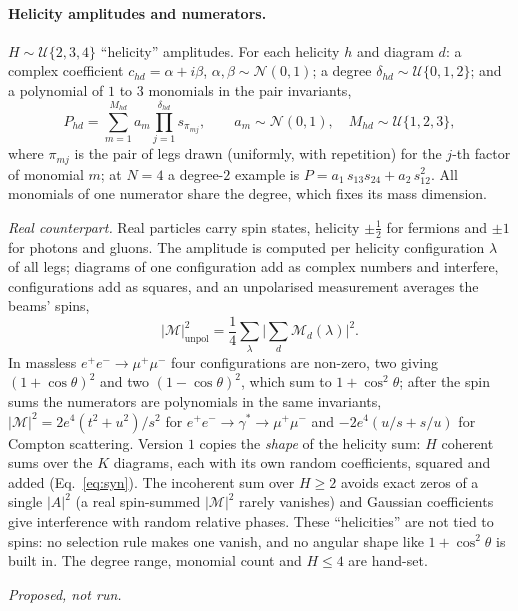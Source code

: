 \documentclass[11pt]{article}
\begin{document}
\paragraph{Helicity amplitudes and numerators.} $H\sim\mathcal U\{2,3,4\}$ ``helicity'' amplitudes. For each helicity
$h$ and diagram $d$: a complex coefficient $c_{hd}=\alpha+i\beta$, $\alpha,\beta\sim\mathcal N(0,1)$; a degree
$\delta_{hd}\sim\mathcal U\{0,1,2\}$; and a polynomial of $1$ to $3$ monomials in the pair invariants,
\begin{equation}
  P_{hd}=\sum_{m=1}^{M_{hd}}a_m\prod_{j=1}^{\delta_{hd}}s_{\pi_{mj}},\qquad a_m\sim\mathcal N(0,1),\quad
  M_{hd}\sim\mathcal U\{1,2,3\},
\end{equation}
where $\pi_{mj}$ is the pair of legs drawn (uniformly, with repetition) for the $j$-th factor of monomial $m$; at $N=4$ a
degree-$2$ example is $P=a_1\,s_{13}s_{24}+a_2\,s_{12}^2$. All monomials of one numerator share the degree, which fixes
its mass dimension.
\par\smallskip\noindent \emph{Real counterpart.} Real particles carry spin states, helicity $\pm\tfrac12$ for fermions and $\pm1$ for photons
and gluons. The amplitude is computed per helicity configuration $\lambda$ of all legs; diagrams of one configuration add
as complex numbers and interfere, configurations add as squares, and an unpolarised measurement averages the beams'
spins,
\begin{equation*}
  |\mathcal M|^2_\text{unpol}=\frac14\sum_\lambda\Big|\sum_d\mathcal M_d(\lambda)\Big|^2 .
\end{equation*}
In massless $e^+e^-\to\mu^+\mu^-$ four configurations are non-zero, two giving $(1+\cos\theta)^2$ and two
$(1-\cos\theta)^2$, which sum to $1+\cos^2\theta$; after the spin sums the numerators are polynomials in the same
invariants, $|\mathcal M|^2=2e^4(t^2+u^2)/s^2$ for $e^+e^-\to\gamma^*\to\mu^+\mu^-$ and $-2e^4(u/s+s/u)$ for Compton
scattering. Version $1$ copies the \emph{shape} of the helicity sum: $H$ coherent sums over the $K$ diagrams, each with its
own random coefficients, squared and added (Eq.~\eqref{eq:syn}). The incoherent sum over $H\ge2$ avoids exact zeros of a
single $|A|^2$ (a real spin-summed $|\mathcal M|^2$ rarely vanishes) and Gaussian coefficients give interference with
random relative phases. These ``helicities'' are not tied to spins: no selection rule makes one vanish, and no angular
shape like $1+\cos^2\theta$ is built in. The degree range, monomial count and $H\le4$ are hand-set.
\par\smallskip\noindent \emph{Proposed, not run.}
\end{document}
